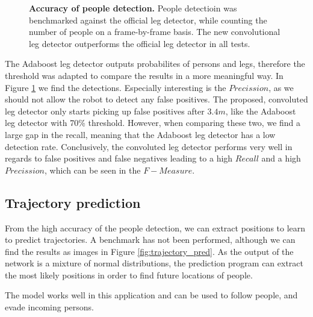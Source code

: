 \begin{figure}
	\normalsize
	\begin{center}
		
	\end{center}
	\caption{\textbf{Accuracy of people detection.} People detectioin was benchmarked against the official leg detector, while counting the number of people on a frame-by-frame basis. The new convolutional leg detector outperforms the official leg detector in all tests.}
	\label{fig:people_detection}
\end{figure}

The Adaboost leg detector outputs probabilites of persons and legs, therefore the threshold was adapted to compare the results in a more meaningful way. In Figure \ref{fig:people_detection} we find the detections. Especially interesting is the $Precission$, as we should not allow the robot to detect any false positives. The proposed, convoluted leg detector only starts picking up false positives after $3.4 m$, like the Adaboost leg detector with 70\% threshold. However, when comparing these two, we find a large gap in the recall, meaning that the Adaboost leg detector has a low detection rate.
Conclusively, the convoluted leg detector performs very well in regards to false positives and false negatives leading to a high $Recall$ and a high $Precission$, which can be seen in the $F-Measure$.


\subsection{Trajectory prediction}

From the high accuracy of the people detection, we can extract positions to learn to predict trajectories. A benchmark has not been performed, although we can find the results as images in Figure \ref{fig:trajectory_pred}. As the output of the network is a mixture of normal distributions, the prediction program can extract the most likely positions in order to find future locations of people.

The model works well in this application and can be used to follow people, and evade incoming persons. 